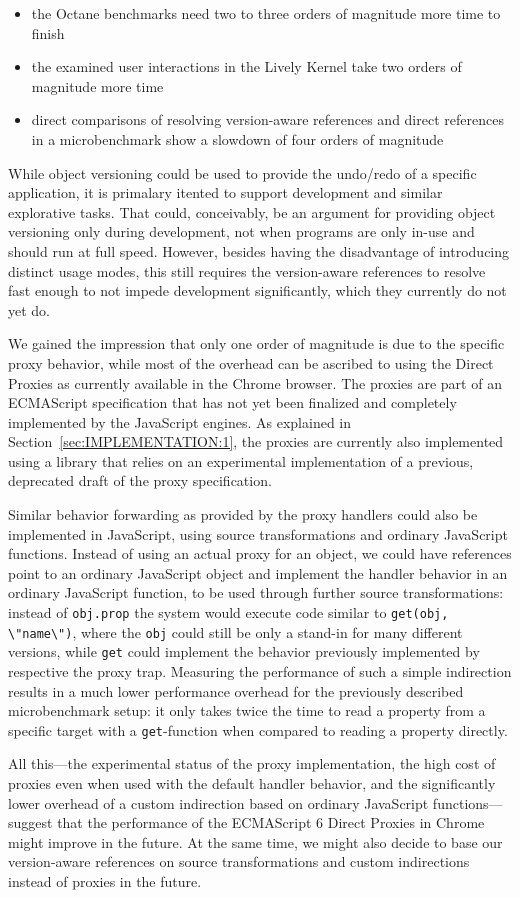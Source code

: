 \begin{itemize}
    \item the Octane benchmarks need two to three orders of magnitude more time to finish
    \item the examined user interactions in the Lively Kernel take two orders of magnitude more time
    \item direct comparisons of resolving version-aware references and direct references in a microbenchmark show a slowdown of four orders of magnitude
\end{itemize}

While object versioning could be used to provide the undo/redo of a specific application, it is primalary itented to support development and similar explorative tasks.
That could, conceivably, be an argument for providing object versioning only during development, not when programs are only in-use and should run at full speed.
However, besides having the disadvantage of introducing distinct usage modes, this still requires the version-aware references to resolve fast enough to not impede development significantly, which they currently do not yet do.

We gained the impression that only one order of magnitude is due to the specific proxy behavior, while most of the overhead can be ascribed to using the Direct Proxies as currently available in the Chrome browser.
The proxies are part of an ECMAScript specification that has not yet been finalized and completely implemented by the JavaScript engines.
As explained in Section~\ref{sec:IMPLEMENTATION:1}, the proxies are currently also implemented using a library that relies on an experimental implementation of a previous, deprecated draft of the proxy specification.

Similar behavior forwarding as provided by the proxy handlers could also be implemented in JavaScript, using source transformations and ordinary JavaScript functions.
Instead of using an actual proxy for an object, we could have references point to an ordinary JavaScript object and implement the handler behavior in an ordinary JavaScript function, to be used through further source transformations: instead of \lstinline{obj.prop} the system would execute code similar to \lstinline{get(obj, \"name\")}, where the \lstinline{obj} could still be only a stand-in for many different versions, while \lstinline{get} could implement the behavior previously implemented by respective the proxy trap.
Measuring the performance of such a simple indirection results in a much lower performance overhead for the previously described microbenchmark setup:
it only takes twice the time to read a property from a specific target with a \lstinline{get}-function when compared to reading a property directly.

All this---the experimental status of the proxy implementation, the high cost of proxies even when used with the default handler behavior, and the significantly lower overhead of a custom indirection based on ordinary JavaScript functions---suggest that the performance of the ECMAScript 6 Direct Proxies in Chrome might improve in the future.
At the same time, we might also decide to base our version-aware references on source transformations and custom indirections instead of proxies in the future.
